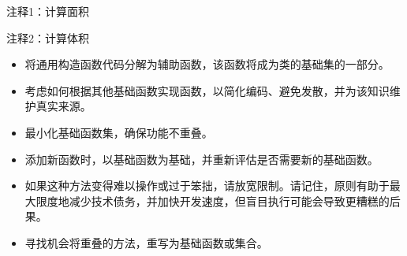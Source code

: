 {\footnotesize
注释1：计算面积

注释2：计算体积
}


\begin{itemize}
\item
将通用构造函数代码分解为辅助函数，该函数将成为类的基础集的一部分。

\item
考虑如何根据其他基础函数实现函数，以简化编码、避免发散，并为该知识维护真实来源。

\item
最小化基础函数集，确保功能不重叠。

\item
添加新函数时，以基础函数为基础，并重新评估是否需要新的基础函数。

\item
如果这种方法变得难以操作或过于笨拙，请放宽限制。请记住，原则有助于最大限度地减少技术债务，并加快开发速度，但盲目执行可能会导致更糟糕的后果。

\item
寻找机会将重叠的方法，重写为基础函数或集合。
\end{itemize}























